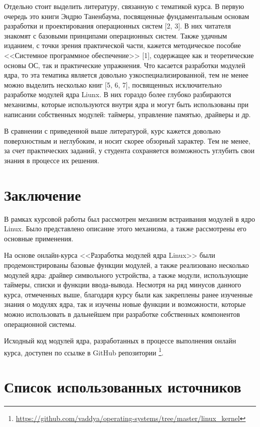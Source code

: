 Отдельно стоит выделить литературу, связанную с тематикой курса. В первую очередь это книги Эндрю Таненбаума, посвященные фундаментальным основам разработки и проектирования операционных систем [2, 3]. В них читателя знакомят с базовыми принципами операционных систем. Также удачным изданием, с точки зрения практической части, кажется методическое пособие <<Системное программное обеспечение>> [1], содержащее как и теоретические основы ОС, так и практические упражнения. Что касается разработки модулей ядра, то эта тематика является довольно узкоспециализированной, тем не менее можно выделить несколько книг [5, 6, 7], посвященных исключительно разработке модулей ядра Liunx. В них гораздо более глубоко разбираются механизмы, которые используются внутри ядра и могут быть использованы при написании собственных модулей: таймеры, управление памятью, драйверы и др.

В сравнении с приведенной выше литературой, курс кажется довольно поверхностным и неглубоким, и носит скорее обзорный характер. Тем не менее, за счет практических заданий, у студента сохраняется возможность углубить свои знания в процессе их решения.

\newpage

\section{Заключение}

В рамках курсовой работы был рассмотрен механизм встраивания модулей в ядро Linux. Было представлено описание этого механизма, а также рассмотрены его основные применения.

На основе онлайн-курса <<Разработка модулей ядра Linux>> были продемонстрированы базовые функции модулей, а также реализовано несколько модулей ядра: драйвер символьного устройства, а также модули, использующие таймеры, списки и функции ввода-вывода. Несмотря на ряд минусов данного курса, отмеченных выше, благодаря курсу были как закреплены ранее изученные знания о модулях ядра, так и изучены новые функции и возможности, которые можно использовать в дальнейшем при разработке собственных компонентов операционной системы.

Исходный код модулей ядра, разработанных в процессе выполнения онлайн курса, доступен по ссылке в GitHub репозитории \footnote{\url{https://github.com/vaddya/operating-systems/tree/master/linux_kernel}}.

\newpage

\section*{Список использованных источников}

